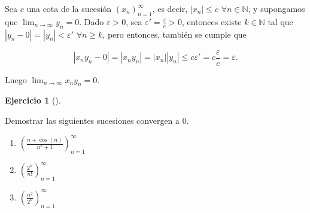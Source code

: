 \documentclass[
  a4paper,
]{scrreport}
\theoremstyle{definition}
\newtheorem{exercise}{Ejercicio}[chapter]
\theoremstyle{remark}
\begin{document}
\begin{tcolorbox}[enhanced jigsaw, coltitle=black, left=2mm, opacityback=0, colback=white, opacitybacktitle=0.6, breakable, colbacktitle=quarto-callout-tip-color!10!white, leftrule=.75mm, toptitle=1mm, arc=.35mm, bottomtitle=1mm, rightrule=.15mm, titlerule=0mm, title=\textcolor{quarto-callout-tip-color}{\faLightbulb}\hspace{0.5em}{Solución}, colframe=quarto-callout-tip-color-frame, toprule=.15mm, bottomrule=.15mm]
Sea \(c\) una cota de la sucesión \((x_n)_{n=1}^\infty\), es decir,
\(|x_n|\leq c\) \(\forall n\in\mathbb{N}\), y supongamos que
\(\lim_{n\to\infty}y_n=0\). Dado \(\varepsilon>0\), sea
\(\varepsilon'=\frac{\varepsilon}{c}>0\), entonces existe
\(k\in\mathbb{N}\) tal que \(|y_n-0|=|y_n|<\varepsilon'\)
\(\forall n\geq k\), pero entonces, también se cumple que

\[
|x_ny_n-0| = |x_ny_n| = |x_n||y_n| \leq c\varepsilon' = c\frac{\varepsilon}{c} = \varepsilon.
\]

Luego \(\lim_{n\to\infty}x_ny_n = 0\).
\end{tcolorbox}

\leavevmode{}%
\begin{exercise}[]\label{exr-compresion-sucesiones}

Demostrar las siguientes sucesiones convergen a \(0\).

\begin{enumerate}
\def\labelenumi{\alph{enumi}.}
\item
  \(\left(\frac{n+\cos(n)}{n^2+1}\right)_{n=1}^\infty\)
\item
  \(\left(\frac{2^n}{n!}\right)_{n=1}^\infty\)
\item
  \(\left(\frac{n^2}{2^n}\right)_{n=1}^\infty\)
\end{enumerate}

\end{exercise}
\end{document}
